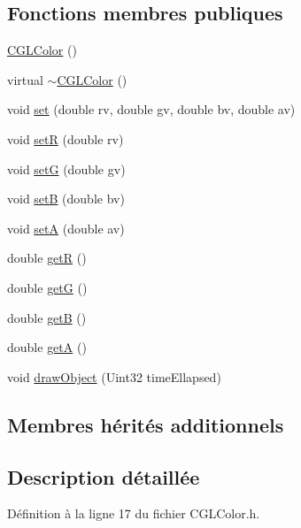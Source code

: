 \subsection*{Fonctions membres publiques}
\begin{DoxyCompactItemize}
\item 
\hyperlink{class_c_g_l_color_ab6e65b639ac6545e43d3b54ef9de7eaf}{C\-G\-L\-Color} ()
\item 
virtual \hyperlink{class_c_g_l_color_ad5d7a52bc05be0c30b50a1c3bc64bbd6}{$\sim$\-C\-G\-L\-Color} ()
\item 
void \hyperlink{class_c_g_l_color_ae493568c85c39e3573ad8ef9600b720a}{set} (double rv, double gv, double bv, double av)
\item 
void \hyperlink{class_c_g_l_color_af025a76284d339268246c03a929f27f4}{set\-R} (double rv)
\item 
void \hyperlink{class_c_g_l_color_a2b737fc4b94021e2cdaad2c1c98d3cef}{set\-G} (double gv)
\item 
void \hyperlink{class_c_g_l_color_ac898e4d49846a3b3788daeb535c5bccc}{set\-B} (double bv)
\item 
void \hyperlink{class_c_g_l_color_a4bf56920a8621fcc8db155b7cc60d5a1}{set\-A} (double av)
\item 
double \hyperlink{class_c_g_l_color_ac6d5a5366ee03d2061d6c79981d322c4}{get\-R} ()
\item 
double \hyperlink{class_c_g_l_color_a49f6584fa824f5a08f403d86d0bdfcf0}{get\-G} ()
\item 
double \hyperlink{class_c_g_l_color_a2908eed3bfda5ae231dbafd8df81daec}{get\-B} ()
\item 
double \hyperlink{class_c_g_l_color_a8fd36d7e2f7e55ba24dd95a66ab51c32}{get\-A} ()
\item 
void \hyperlink{class_c_g_l_color_a69d92c401c12b7846c458c41a564b3ae}{draw\-Object} (Uint32 time\-Ellapsed)
\end{DoxyCompactItemize}
\subsection*{Membres hérités additionnels}


\subsection{Description détaillée}


Définition à la ligne 17 du fichier C\-G\-L\-Color.\-h.



